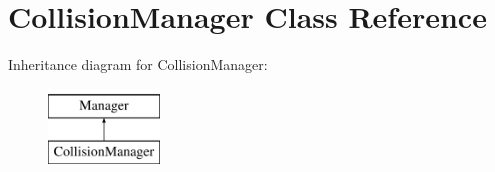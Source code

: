 \hypertarget{class_collision_manager}{\section{Collision\+Manager Class Reference}
\label{class_collision_manager}
}
Inheritance diagram for Collision\+Manager\+:\begin{figure}[H]
\begin{center}
\leavevmode
\includegraphics[height=2.000000cm]{class_collision_manager}
\end{center}
\end{figure}
